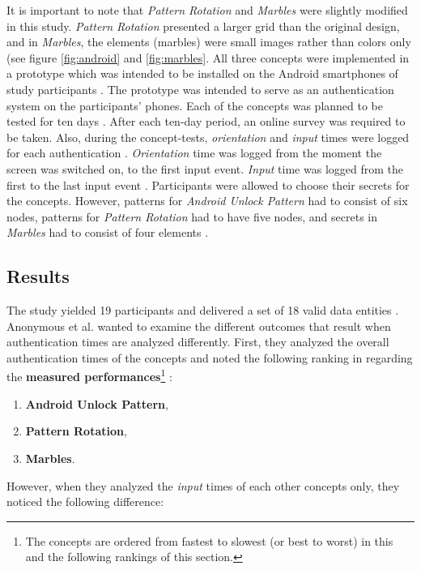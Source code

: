 It is important to note that \textit{Pattern Rotation} and \textit{Marbles} \cite{Marbles} were slightly modified in this study. \textit{Pattern Rotation} presented a larger grid than the original design, and in \textit{Marbles}, the elements (marbles) were small images rather than colors only (see figure \ref{fig:android} and \ref{fig:marbles}. All three concepts were implemented in a prototype which was intended to be installed on the Android smartphones of study participants \cite{anonymous}. The prototype was intended to serve as an authentication system on the participants' phones. Each of the concepts was planned to be tested for ten days \cite{anonymous}. After each ten-day period, an online survey was required to be taken. Also, during the concept-tests, \textit{orientation} and \textit{input} times were logged for each authentication \cite{anonymous}. \textit{Orientation} time was logged from the moment the screen was switched on, to the first input event. \textit{Input} time was logged from the first to the last input event \cite{anonymous}. Participants were allowed to choose their secrets for the concepts. However, patterns for \textit{Android Unlock Pattern} had to consist of six nodes, patterns for \textit{Pattern Rotation} had to have five nodes, and secrets in \textit{Marbles} had to consist of four elements \cite{anonymous}.

\subsection{Results}

The study yielded 19 participants and delivered a set of 18 valid data entities \cite{anonymous}. Anonymous et al. \cite{anonymous} wanted to examine the different outcomes that result when authentication times are analyzed differently. First, they analyzed the overall authentication times of the concepts and noted the following ranking in regarding the \textbf{measured performances}\footnote{The concepts are ordered from fastest to slowest (or best to worst) in this and the following rankings of this section.} \cite{anonymous}:

\begin{enumerate}
    \item \textbf{Android Unlock Pattern},
    \item \textbf{Pattern Rotation},
    \item \textbf{Marbles}.
\end{enumerate} 

However, when they analyzed the \textit{input} times of each other concepts only, they noticed the following difference:

